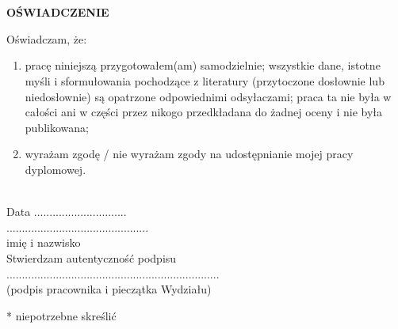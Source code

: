 \documentclass[12pt,a4paper,twoside,openright]{report}
\author{Karol Zygadło}
\begin{document}
    \begin{titlepage}
    
    \end{titlepage}
\begingroup
    \let\clearpage\relax
    \tableofcontents
    
    
    
\endgroup

\medskip
\printbibliography[type=online, title={Netografia\footnote{Podane adresy zostały odwiedzone w maju 2020 roku. Nie ma gwarancji, że po tej dacie będą dalej aktywne lub poprawne.}}]
\printbibliography[type=book, title={Bibliografia}]
\lstlistoflistings
\listoffigures
\listoftables

\newpage

\chapter*{}
\centering\textbf{OŚWIADCZENIE\\[6mm]}
\raggedright
Oświadczam, że: 
\begin{enumerate}
    \item pracę niniejszą przygotowałem(am) samodzielnie; wszystkie dane, istotne myśli i sformułowania pochodzące 
z literatury (przytoczone dosłownie lub niedosłownie) są opatrzone odpowiednimi odsyłaczami; praca ta nie była 
w całości ani w części przez nikogo przedkładana do żadnej oceny i nie była publikowana;
    \item wyrażam zgodę / nie wyrażam zgody na udostępnianie mojej pracy dyplomowej. 
\end{enumerate}\\[10mm]
Data ..............................\\[15mm]


\centering
\hspace{200pt} ..............................................\\[0mm]
\hspace{200pt} imię i nazwisko\\[10mm]
\hspace{200pt} Stwierdzam autentyczność podpisu\\[5mm]
\hspace{200pt} .....................................................................\\[0mm]
\hspace{200pt} (podpis  pracownika i pieczątka Wydziału)\\[20mm]
 
 \raggedright
 * niepotrzebne skreślić
\end{document}
